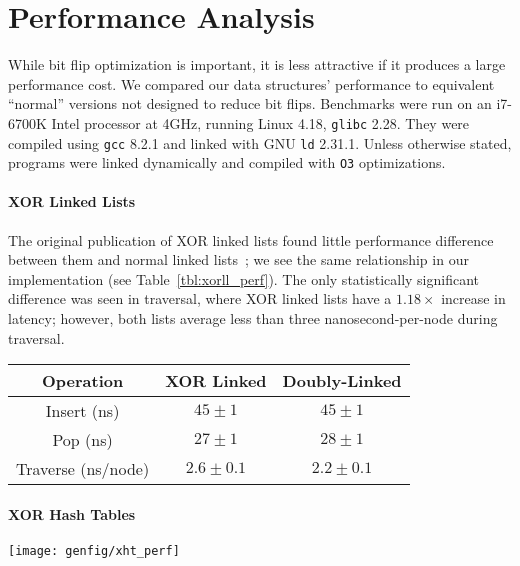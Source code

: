 \section{Performance Analysis}
\label{sec:perf}

While bit flip optimization is important, it is less attractive if it produces a
large performance cost. We compared our data structures' performance to equivalent ``normal''
versions not designed to reduce bit flips.
Benchmarks were run on an i7-6700K Intel processor at 4GHz, running Linux 4.18, \texttt{glibc} 2.28.
They were compiled using \texttt{gcc} 8.2.1 and linked with GNU \texttt{ld} 2.31.1. Unless
otherwise stated, programs were linked dynamically and compiled with \texttt{O3}
optimizations.

\paragraph{XOR Linked Lists}

The original publication of XOR linked lists found little performance difference
between them and normal linked lists~\cite{xorll}; we see the same relationship
in our implementation (see Table~\ref{tbl:xorll_perf}). The only statistically
significant difference was seen in traversal, where XOR linked lists have a
$1.18\times$ increase in latency; however, both lists average less than three
nanosecond-per-node during traversal.

\begin{SCtable}
	\centering
	\caption{Performance of XOR linked lists compared with doubly-linked lists.}
	\label{tbl:xorll_perf}
	\begin{tabular}{c|c c}
		Operation          & XOR Linked    & Doubly-Linked \\
		\hline
		Insert (ns)        & $45 \pm 1$    & $45 \pm 1$    \\
		Pop (ns)           & $27 \pm 1$    & $28 \pm 1$    \\
		Traverse (ns/node) & $2.6 \pm 0.1$ & $2.2 \pm 0.1$ \\
	\end{tabular}
\end{SCtable}

\paragraph{XOR Hash Tables}



\begin{SCfigure}
	\centering
	\texttt{[image: genfig/xht\_perf]}
	\caption{Performance of XOR hash table variants.}
	\label{fig:xht_perf}
\end{SCfigure}

